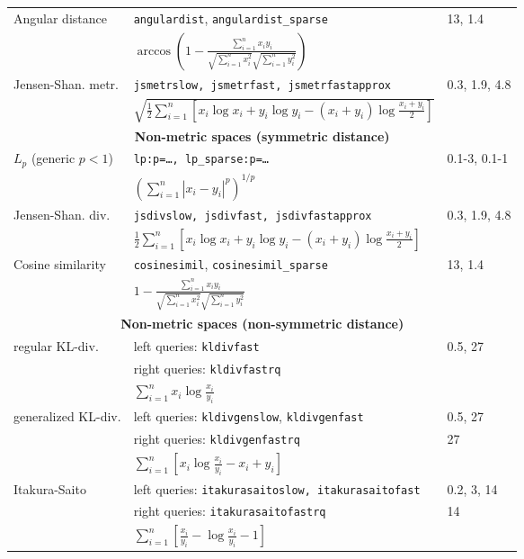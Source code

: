\documentclass[runningheads,a4paper]{llncs}
\newcommand{\ttt}[1]{\texttt{#1}}
\begin{document}
{\begin{table}
\begin{tabular}{l@{\hspace{2mm}}l@{\hspace{2mm}}l}
\cmidrule(l){1-3} 
Angular distance & \ttt{angulardist}, \ttt{angulardist\_sparse} & { 13, 1.4 } \\
                        & $\arccos\left(1-\frac{\sum_{i=1}^n x_i y_i}{\sqrt{\sum_{i=1}^n x_i^2}\sqrt{\sum_{i=1}^n y_i^2 }}\right)$   & \\
\cmidrule(l){1-3} 
Jensen-Shan. metr. &\ttt{jsmetrslow, jsmetrfast, jsmetrfastapprox} &  0.3, 1.9, 4.8  \\
                          & $\sqrt{\frac{1}{2}\sum_{i=1}^n \left[x_i \log x_i + y_i \log y_i  - (x_i+y_i)\log \frac{x_i +y_i}{2}\right]}$  & \vspace{1em} \\
\toprule
\multicolumn{3}{c}{\textbf{Non-metric spaces (symmetric distance)}}  \\
\toprule
$L_p$ (generic $p < 1$)& \ttt{lp:p=\ldots, lp\_sparse:p=\ldots}                     &  0.1-3, 0.1-1 \\
                              & $\left(\sum_{i=1}^n |x_i-y_i|^p\right)^{1/p}$  &   \\
\cmidrule(l){1-3} 
Jensen-Shan. div. &\ttt{jsdivslow, jsdivfast, jsdivfastapprox} &   0.3, 1.9, 4.8 \\
                          & $\frac{1}{2}\sum_{i=1}^n \left[x_i \log x_i + y_i \log y_i  - (x_i+y_i)\log \frac{x_i +y_i}{2}\right]$ & \\
\cmidrule(l){1-3} 
Cosine similarity & \ttt{cosinesimil}, \ttt{cosinesimil\_sparse} & { 13, 1.4 } \\
                        & $1-\frac{\sum_{i=1}^n x_i y_i}{\sqrt{\sum_{i=1}^n x_i^2}\sqrt{\sum_{i=1}^n y_i^2 }}$   & \vspace{1em} \\
\toprule
\multicolumn{3}{c}{\textbf{Non-metric spaces (non-symmetric distance)}}  \\
\toprule
regular KL-div. & left queries: \ttt{kldivfast}       & 0.5, 27 \\
                       & right queries: \ttt{kldivfastrq}    &  \\
                       & $\sum_{i=1}^n   x_i \log \frac{x_i}{y_i}$  & \\ 
\cmidrule(l){1-3} 
generalized KL-div. & left queries: \ttt{kldivgenslow}, \ttt{kldivgenfast} & 0.5, 27    \\
                           & right queries: \ttt{kldivgenfastrq} & 27    \\
                           & $\sum_{i=1}^n \left[  x_i \log \frac{x_i}{y_i} -   x_i +   y_i \right]$   &   \\
\cmidrule(l){1-3} 
Itakura-Saito & left queries: \ttt{itakurasaitoslow, itakurasaitofast}   & 0.2, 3, 14 \\
              & right queries: \ttt{itakurasaitofastrq}                  & 14         \\
              & $\sum_{i=1}^n \left[ \frac{ x_i}{y_i} - \log \frac{x_i}{y_i}  -1 \right]$ \\
\toprule
\end{tabular}
\end{table}

}
\end{document}
